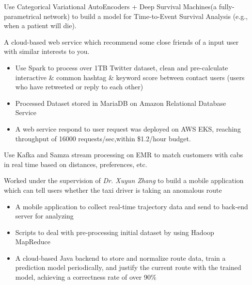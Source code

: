 \documentclass{resume}
\begin{document}
\begin{flushleft}
Use Categorical Variational AutoEncoders + Deep Survival Machines(a fully-parametrical network) to build a model for Time-to-Event Survival Analysis (e.g., when a patient will die).

A cloud-based web service which recommend some close friends of a input user with similar interests to you.
\begin{itemize}
    \item Use Spark to process over 1TB Twitter dataset, clean and pre-calculate interactive \& common hashtag \linebreak \& keyword score between contact users (users who have retweeted or reply to each other)
    \item Processed Dataset stored in MariaDB on Amazon Relational Database Service
    \item A web service respond to user request was deployed on AWS EKS, reaching throughput of 16000 requests/sec,\linebreak within \$1.2/hour budget.
\end{itemize}


Use Kafka and Samza stream processing on EMR to match customers with cabs in real time based on distances, preferences, etc.

Worked under the supervision of \textit{Dr. Xuyun Zhang} to build a mobile application which can tell users whether \linebreak the taxi driver is taking an anomalous route
\begin{itemize}
    \item A mobile application to collect real-time trajectory data and send to back-end server for analyzing
    \item Scripts to deal with pre-processing initial dataset by using Hadoop MapReduce
    \item A cloud-based Java backend to store and normalize route data, train a prediction model periodically, \linebreak and justify the current route with the trained model, achieving a correctness rate of over 90\%
\end{itemize}
\end{flushleft}
\end{document}
